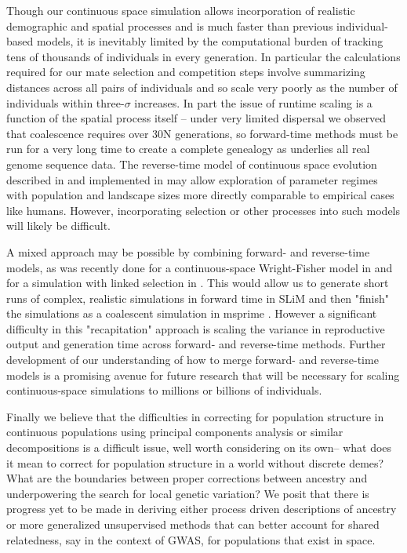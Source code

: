 \documentclass[11pt,twoside,lineno]{preprint}
\newif\ifcomments
\newcommand{\ak}[1]{\ifcomments{{\color{red} \it (#1)}}\else{}\fi}
\begin{document}
Though our continuous space simulation allows incorporation of realistic demographic and spatial processes and is much faster than previous individual-based models, it is inevitably limited by the computational burden of tracking tens of thousands of individuals in every generation. In particular the calculations required for our mate selection and competition steps involve summarizing distances across all pairs of individuals and so scale very poorly \ak{how exactly does this scale? $O(N^2)$?} as the number of individuals within three-$\sigma$ increases. In part the issue of runtime scaling is a function of the spatial process itself -- under very limited dispersal we observed that coalescence requires over 30N generations, so forward-time methods must be run for a very long time to create a complete genealogy as underlies all real genome sequence data. The reverse-time model of continuous space evolution described in \cite{Barton2010} and implemented in \cite{Kelleher2014} may allow exploration of parameter regimes with population and landscape sizes more directly comparable to empirical cases like humans. However, incorporating selection or other processes into such models will likely be difficult. 

A mixed approach may be possible by combining forward- and reverse-time models, as was recently done for a continuous-space Wright-Fisher model in \cite{Lotterhos2019} and for a simulation with linked selection in \cite{Buffalo2019}. This would allow us to generate short runs of complex, realistic simulations in forward time in SLiM \citep{Haller2019} and then "finish" the simulations as a coalescent simulation in msprime \citep{Kelleher2016}. However a significant difficulty in this "recapitation" approach is scaling the variance in reproductive output and generation time across forward- and reverse-time methods. Further development of our understanding of how to merge forward- and reverse-time models is a promising avenue for future research that will be necessary for scaling continuous-space simulations to millions or billions of individuals.  

Finally we believe that the difficulties in correcting for population structure in continuous populations using principal components analysis or similar decompositions is a difficult issue, well worth considering on its own-- what does it mean to correct for population structure in a world without discrete demes? What are the boundaries between proper corrections between ancestry and underpowering the search for local genetic variation? We posit that there is progress yet to be made in deriving either process driven descriptions of ancestry or more generalized unsupervised methods that can better account for shared relatedness, say in the context of GWAS, for populations that exist in space. \ak{this paragraph is a bit out there. rein me in}
\end{document}
